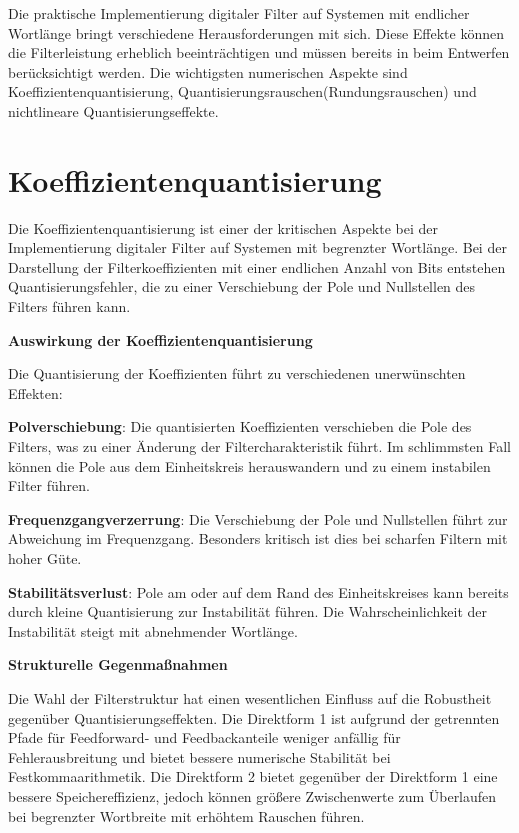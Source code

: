\documentclass[
  ngerman,
  letterpaper,
  DIV=11]{scrreprt}
\begin{document}
Die praktische Implementierung digitaler Filter auf Systemen mit
endlicher Wortlänge bringt verschiedene Herausforderungen mit sich.
Diese Effekte können die Filterleistung erheblich beeinträchtigen und
müssen bereits in beim Entwerfen berücksichtigt werden. Die wichtigsten
numerischen Aspekte sind Koeffizientenquantisierung,
Quantisierungsrauschen(Rundungsrauschen) und nichtlineare
Quantisierungseffekte.

\section{Koeffizientenquantisierung}\label{koeffizientenquantisierung}

Die Koeffizientenquantisierung ist einer der kritischen Aspekte bei der
Implementierung digitaler Filter auf Systemen mit begrenzter Wortlänge.
Bei der Darstellung der Filterkoeffizienten mit einer endlichen Anzahl
von Bits entstehen Quantisierungsfehler, die zu einer Verschiebung der
Pole und Nullstellen des Filters führen kann.

\textbf{Auswirkung der Koeffizientenquantisierung}

Die Quantisierung der Koeffizienten führt zu verschiedenen unerwünschten
Effekten:

\textbf{Polverschiebung}: Die quantisierten Koeffizienten verschieben
die Pole des Filters, was zu einer Änderung der Filtercharakteristik
führt. Im schlimmsten Fall können die Pole aus dem Einheitskreis
herauswandern und zu einem instabilen Filter führen.

\textbf{Frequenzgangverzerrung}: Die Verschiebung der Pole und
Nullstellen führt zur Abweichung im Frequenzgang. Besonders kritisch ist
dies bei scharfen Filtern mit hoher Güte.

\textbf{Stabilitätsverlust}: Pole am oder auf dem Rand des
Einheitskreises kann bereits durch kleine Quantisierung zur Instabilität
führen. Die Wahrscheinlichkeit der Instabilität steigt mit abnehmender
Wortlänge.

\textbf{Strukturelle Gegenmaßnahmen}

Die Wahl der Filterstruktur hat einen wesentlichen Einfluss auf die
Robustheit gegenüber Quantisierungseffekten. Die Direktform 1 ist
aufgrund der getrennten Pfade für Feedforward- und Feedbackanteile
weniger anfällig für Fehlerausbreitung und bietet bessere numerische
Stabilität bei Festkommaarithmetik. Die Direktform 2 bietet gegenüber
der Direktform 1 eine bessere Speichereffizienz, jedoch können größere
Zwischenwerte zum Überlaufen bei begrenzter Wortbreite mit erhöhtem
Rauschen führen.
\end{document}
